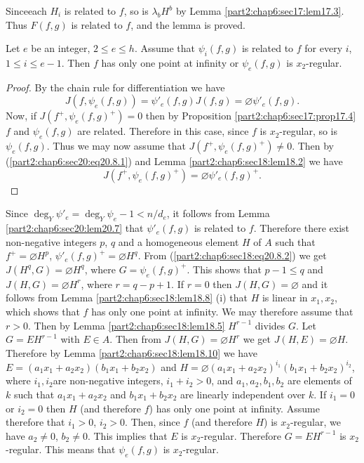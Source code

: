 Since\pageoriginale each $H_i$ is related to $f$, so is $\lambda_b
H^b$ by Lemma \ref{part2:chap6:sec17:lem17.3}. Thus $F(f, g)$ is
related to $f$, and the lemma is proved. 

\begin{lemma}\label{part2:chap6:sec20:lem20.8}
  Let $e$ be an integer, $2 \leq e \leq h$. Assume that $\psi_i (f,
  g)$ is related to $f$ for every $i$, $1 \leq i \leq e-1$. Then $f$
  has only one point at infinity or $\psi_e (f, g)$ is $x_2$-regular.
\end{lemma}

\begin{proof}
  By the chain rule for differentiation we have
\begin{equation*}
  J(f, \psi_e (f, g))= \psi'_e (f, g) J (f, g)= \diameter \psi'_e (f,
  g). \tag{20.8.1} \label{part2:chap6:sec20:eq20.8.1}
\end{equation*}
Now, if $J(f^+, \psi_e (f, g)^+)=0$ then by
Proposition \ref{part2:chap6:sec17:prop17.4} $f$ and $\psi_e (f, g)$
are related. Therefore in this case, since $f$ is $x_2$-regular, so is
$\psi_e(f, g)$. Thus we may now assume that $J(f^+, \psi_e (f,
g)^+)\neq 0$. Then by (\ref{part2:chap6:sec20:eq20.8.1}) and
Lemma \ref{part2:chap6:sec18:lem18.2} we have
\begin{equation*}
  J(f^+, \psi_e (f, g)^+) = \diameter \psi'_e (f,
  g)^+. \tag{20.8.2} \label{part2:chap6:sec18:eq20.8.2} 
\end{equation*}
\end{proof}

Since $\deg_Y \psi'_e= \deg_Y \psi_e -1 < n/d_e$, it follows from
Lemma \ref{part2:chap6:sec20:lem20.7} that $\psi'_e (f, g)$ is related
to $f$. Therefore there exist non-negative integers $p$, $q$ and a
homogeneous element $H$ of $A$ such that $f^+= \diameter H^p$,
$\psi'_e (f, g)^+= \diameter H^q$. From
(\ref{part2:chap6:sec18:eq20.8.2}) we get $J(H^q, G)= \diameter H^q$,
where $G=\psi_e (f, g)^+$. This shows that $p- 1 \leq q$ and $J(H, G)=
\diameter H^r$, where $r= q- p+1$. If $r=0$ then $J(H, G)= \diameter $
and it follows from Lemma \ref{part2:chap6:sec18:lem18.8} (i) that $H$
is linear in $x_1, x_2$, which shows that $f$ has only one point at
infinity. We may therefore assume that $r>0$. Then by
Lemma \ref{part2:chap6:sec18:lem18.5}   $H^{r-1}$ divides $G$. Let $G=
E H^{r-1}$ with $E \in A$. Then from $J(H, G)= \diameter H^r$ we get
$J(H, E)= \diameter H$. Therefore by Lemma
\ref{part2:chap6:sec18:lem18.10} we have $E= (a_1 x_1 + a_2 x_2)(b_1
x_1 + b_2x_2)$ and $H= \diameter (a_1 x_1 + a_2 x_2)^{i_1} (b_1 x_1 +
b_2 x_2)^{i_2}$, where $i_1, i_2$\pageoriginale are non-negative integers, $i_1+ i_2
> 0$, and $a_1,a_2, b_1, b_2$ are elements of $k$ such that $a_1 x_1 +
a_2 x_2$ and $b_1 x_1 + b_2 x_2$ are linearly independent over $k$. If
$i_1 =0$ or $i_2=0$ then $H$ (and therefore $f$) has only one point at
infinity. Assume therefore that $i_1> 0$, $i_2>0$. Then, since $f$
(and therefore $H$) is $x_2$-regular, we have $a_2 \neq 0$, $b_2 \neq
0$. This implies that $E$ is $x_2$-regular. Therefore $G= EH^{r-1}$ is
$x_2$-regular. This means that $\psi_e (f, g)$ is $x_2$-regular.

